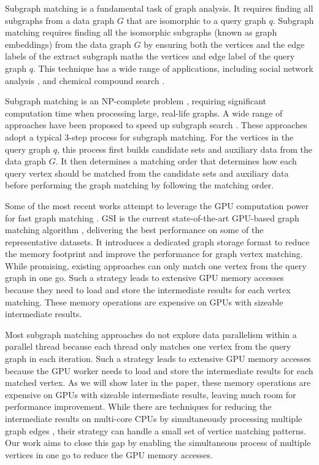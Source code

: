 Subgraph matching is a fundamental task of graph analysis. It requires finding all subgraphs from a data graph $G$ that are isomorphic to a
query graph $q$. Subgraph matching requires finding all the isomorphic subgraphs (known as graph embeddings) from the data graph $G$ by
ensuring both the vertices and the edge labels of the extract subgraph maths the vertices and edge label of the query graph $q$. This
technique has a wide range of applications, including social network analysis \cite{wang2012truss,kairam2012The}, and chemical compound
search \cite{wooyoung2011Biological}.

Subgraph matching is an NP-complete problem \cite{garey1979Computers}, requiring significant computation time when processing large, real-life
graphs. A wide range of approaches have been proposed to speed up subgraph search
\cite{bhattarai2019ceci,guo2020gpu,tran2015fast,shi2020graphpi,bi2016efficient,zeng2020gsi,sun2020subgraph,guo2020exploiting,sun2020rapidmatch,lin2016network}.
These approaches adopt a typical 3-step process for subgraph matching. For the vertices in the query graph $q$, this process first builds
candidate sets and auxiliary data from the data graph $G$. It then determines a matching order that determines how each query vertex
should be matched from the candidate sets and auxiliary data before performing the graph matching by following the matching order.

Some of the most recent works attempt to leverage the GPU computation power for fast graph matching
\cite{lin2016network,guo2020gpu,tran2015fast,zeng2020gsi,guo2020exploiting}. GSI is the current state-of-the-art GPU-based graph matching
algorithm \cite{zeng2020gsi}, delivering the best performance on some of the representative datasets. It introduces a dedicated graph
storage format to reduce the memory footprint and improve the performance for graph vertex matching. While promising, existing approaches
can only match one vertex from the query graph in one go. Such a strategy leads to extensive GPU memory accesses because they need to load
and store the intermediate results for each vertex matching. These memory operations are expensive on GPUs with sizeable intermediate
results.


Most subgraph matching approaches do not explore data parallelism within a parallel thread because each thread only matches one vertex from
the query graph in each iteration. Such a strategy leads to extensive GPU memory accesses because the GPU worker needs to load and store
the intermediate results for each matched vertex. As we will show later in the paper, these memory operations are expensive on GPUs with
sizeable intermediate results, leaving much room for performance improvement. While there are techniques for reducing the intermediate
results on multi-core CPUs by simultaneously processing multiple graph edges \cite{lai2015scalable}, their strategy can handle a small set
of vertice matching patterns. Our work aims to close this gap by enabling the simultaneous process of multiple vertices in one go to reduce
the GPU memory accesses.

